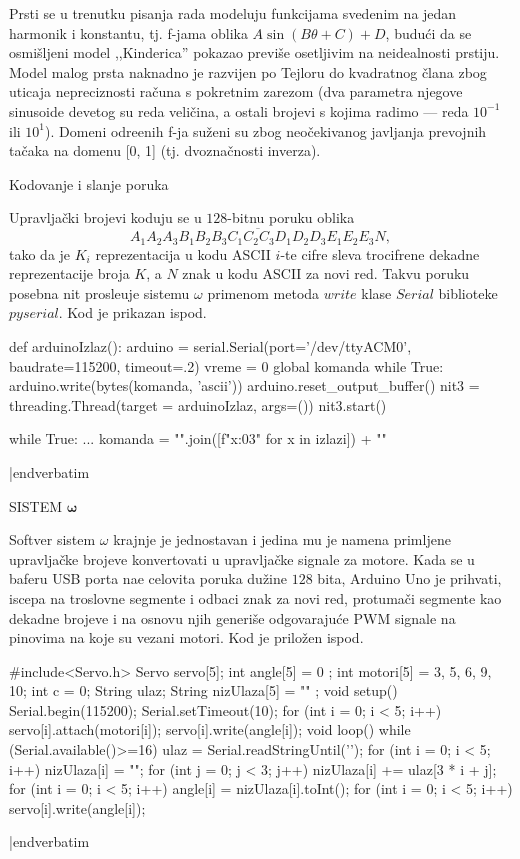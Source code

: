 Prsti se u trenutku pisanja rada modeluju funkcijama svedenim na jedan harmonik i konstantu, tj. f-jama oblika $A\sin(B\theta + C)+D$, budu\'ci da se osmi\v{s}ljeni model ,,Kinderica'' pokazao previ\v{s}e osetljivim na neidealnosti prstiju. Model malog prsta naknadno je razvijen po Tejloru do kvadratnog \v{c}lana zbog uticaja nepreciznosti ra\v{c}una s pokretnim zarezom (dva parametra njegove sinusoide devetog su reda veli\v{c}ina, a ostali brojevi s kojima radimo --- reda $10^{-1}$ ili $10^1$). Domeni odre\dj enih f-ja su\v{z}eni su zbog neo\v{c}ekivanog javljanja prevojnih ta\v{c}aka na domenu [0, 1] (tj. dvozna\v{c}nosti inverza).

\heading Kodovanje i slanje poruka \endheading

Upravlja\v{c}ki brojevi koduju se u $128$-bitnu poruku oblika $$\overline{A_1A_2A_3B_1B_2B_3C_1C_2C_3D_1D_2D_3E_1E_2E_3N},$$ tako da je $K_i$ reprezentacija u kodu ASCII $i$-te cifre sleva trocifrene dekadne reprezentacije broja $K$, a $N$ znak u kodu ASCII za novi red. Takvu poruku posebna nit prosle\dj uje sistemu $\omega$ primenom metoda $write$ klase $Serial$ biblioteke $pyserial$. Kod je prikazan ispod. 

{\eightpoint
\verbatim


def arduinoIzlaz():
  arduino = serial.Serial(port='/dev/ttyACM0', baudrate=115200, timeout=.2)
  vreme = 0
  global komanda
  while True:
    arduino.write(bytes(komanda, 'ascii'))
    arduino.reset_output_buffer()
nit3 = threading.Thread(target = arduinoIzlaz, args=())
nit3.start()

while True:
    ...
    komanda = "".join([f"{x:03}" for x in izlazi]) + "\n"

|endverbatim
}

\specialhead
SISTEM $\pmb\omega$
\endspecialhead

Softver sistem $\omega$ krajnje je jednostavan i jedina mu je namena primljene upravlja\v{c}ke brojeve konvertovati u upravlja\v{c}ke signale za motore. Kada se u baferu USB porta na\dj e celovita poruka du\v{z}ine $128$ bita, Arduino Uno je prihvati, iscepa na troslovne segmente i odbaci znak za novi red, protuma\v{c}i segmente kao dekadne brojeve i na osnovu njih generi\v{s}e odgovaraju\'ce PWM signale na pinovima na koje su vezani motori. Kod je prilo\v{z}en ispod.

{\eightpoint
\verbatim


#include<Servo.h>
Servo servo[5];
int angle[5] = { 0 };
int motori[5] = {3, 5, 6, 9, 10};
int c = 0;
String ulaz;
String nizUlaza[5] = { "" };
void setup() {
  Serial.begin(115200);
  Serial.setTimeout(10);
  for (int i = 0; i < 5; i++)
  {
    servo[i].attach(motori[i]);
    servo[i].write(angle[i]);
  }
}
void loop() {
  while (Serial.available()>=16)
  {
    ulaz = Serial.readStringUntil('\n');
    for (int i = 0; i < 5; i++)
    {
      nizUlaza[i] = "";
      for (int j = 0; j < 3; j++)
        nizUlaza[i] += ulaz[3 * i + j];
    }
    for (int i = 0; i < 5; i++)
      angle[i] = nizUlaza[i].toInt();
  }
  for (int i = 0; i < 5; i++)
    servo[i].write(angle[i]);
}

|endverbatim

}

\bye
